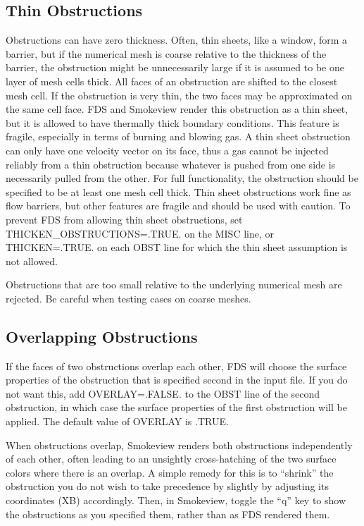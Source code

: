 \documentclass[11pt]{book}
\begin{document}
\subsection{Thin Obstructions}

Obstructions can have zero thickness. Often, thin sheets, like a window, form a barrier, but if the numerical mesh is coarse relative to the thickness of the barrier, the obstruction might be unnecessarily large if it is assumed to be one layer of mesh cells thick. All faces of an obstruction are shifted to the closest mesh cell. If the obstruction is very thin, the two faces may be approximated on the same cell face. FDS and Smokeview render this obstruction as a thin sheet, but it is allowed to have thermally thick boundary conditions. This feature is fragile, especially in terms of burning and blowing gas. A thin sheet obstruction can only have one velocity vector on its face, thus a gas cannot be injected reliably from a thin obstruction because whatever is pushed from one side is necessarily pulled from the other. For full functionality, the obstruction should be specified to be at least one mesh cell thick. Thin sheet obstructions work fine as flow barriers, but other features are fragile and should be used with caution. To prevent FDS from allowing thin sheet obstructions, set {\ct THICKEN\_OBSTRUCTIONS=.TRUE.} on the {\ct MISC} line, or {\ct THICKEN=.TRUE.} on each {\ct OBST} line for which the thin sheet assumption is not allowed.

Obstructions that are too small relative to the underlying numerical mesh are rejected. Be careful when testing cases on coarse meshes.

\subsection{Overlapping Obstructions}

If the faces of two obstructions overlap each other, FDS will choose the surface properties of the obstruction that is specified second in the input file. If you do not want this, add {\ct OVERLAY=.FALSE.} to the {\ct OBST} line of the second obstruction, in which case the surface properties of the first obstruction will be applied. The default value of {\ct OVERLAY} is {\ct .TRUE.}

When obstructions overlap, Smokeview renders both obstructions independently of each other, often leading to an unsightly cross-hatching of the two surface colors where there is an overlap. A simple remedy for this is to ``shrink'' the obstruction you do not wish to take precedence by slightly by adjusting its coordinates ({\ct XB}) accordingly. Then, in Smokeview, toggle the ``q'' key to show the obstructions as you specified them, rather than as FDS rendered them.
\end{document}
